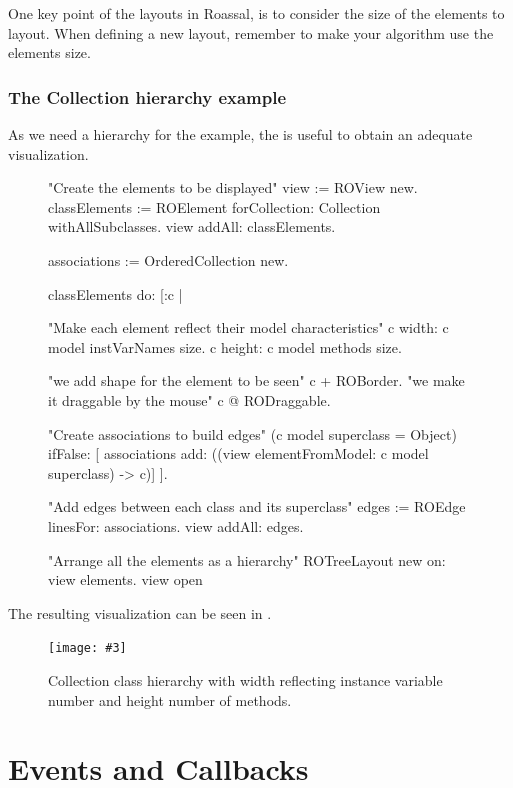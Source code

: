 \documentclass[a4paper,10pt,twoside]{book}
\newcommand{\fig}[4]{
		\begin{figure}[#1]
			\centering
			\texttt{[image: \#3]}
			\caption{\label{fig:#3}#4}
		\end{figure}}
\begin{document}
One key point of the layouts in Roassal, is to consider the size of the elements to layout. When defining a new layout, remember to make your algorithm use the elements size.

\subsubsection{The Collection hierarchy example}

As we need a hierarchy for the  example, the  is useful to obtain an adequate visualization.

\begin{figure}[H]
\begin{code}{}

"Create the elements to be displayed"
view := ROView new.
classElements := ROElement forCollection: Collection withAllSubclasses.
view addAll: classElements.

associations := OrderedCollection new.

classElements do: [:c | 

	"Make each element reflect their model characteristics"
	c width: c model instVarNames size.
	c height: c model methods size.
	
	"we add shape for the element to be seen"
	c + ROBorder. 
	"we make it draggable by the mouse"
	c @ RODraggable.
	
	"Create associations to build edges"
	(c model superclass = Object)
		ifFalse: [ associations add: ((view elementFromModel: c model superclass) -> c)]	
	 ].
	 
"Add edges between each class and its superclass"
edges := ROEdge linesFor: associations.
view addAll: edges.

"Arrange all the elements as a hierarchy"
ROTreeLayout new on: view elements.
view open
\end{code}
\end{figure}

The resulting visualization can be seen in .

\fig{H}{0.4}{collectionHierarchy}{Collection class hierarchy with width reflecting instance variable number and height number of methods.}


\section{Events and Callbacks}
\end{document}
